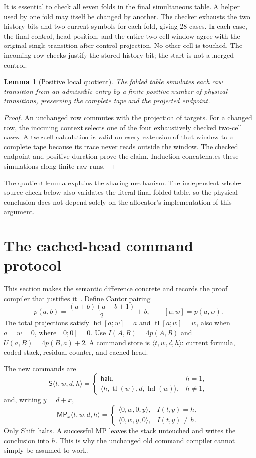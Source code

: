 \documentclass[11pt]{article}
\newtheorem{lemma}[theorem]{Lemma}
\newcommand{\MP}{\mathsf{MP}}
\newcommand{\Shift}{\mathsf{S}}
\begin{document}
It is essential to check all seven folds in the final simultaneous table.
A helper used by one fold may itself be changed by another. The checker
exhausts the two history bits and two current symbols for each fold,
giving 28 cases. In each case, the final control, head position, and the
entire two-cell window agree with the original single transition after
control projection. No other cell is touched. The incoming-row checks
justify the stored history bit; the start is not a merged control.

\begin{lemma}[Positive local quotient]
The folded table simulates each raw transition from an admissible entry
by a finite positive number of physical transitions, preserving the
complete tape and the projected endpoint.
\end{lemma}
\begin{proof}
An unchanged row commutes with the projection of targets. For a changed
row, the incoming context selects one of the four exhaustively checked
two-cell cases. A two-cell calculation is valid on every extension of
that window to a complete tape because its trace never reads outside
the window. The checked endpoint and positive duration prove the claim.
Induction concatenates these simulations along finite raw runs.
\end{proof}

The quotient lemma explains the sharing mechanism. The independent
whole-source check below also validates the literal final folded table,
so the physical conclusion does not depend solely on the allocator's
implementation of this argument.

\section{The cached-head command protocol}\label{sec:commands}

This section makes the semantic difference concrete and records the
proof compiler that justifies it~\cite{pa195c}. Define Cantor pairing
\[
p(a,b)=\frac{(a+b)(a+b+1)}2+b,\qquad [a;w]=p(a,w).
\]
The total projections satisfy $\operatorname{hd}[a;w]=a$ and
$\operatorname{tl}[a;w]=w$, also when $a=w=0$, where $[0;0]=0$.
Use $I(A,B)=4p(A,B)$ and $U(a,B)=4p(B,a)+2$.
A command store is $\langle t,w,d,h\rangle$: current formula, coded stack,
residual counter, and cached head.

The new commands are
\[
\Shift\langle t,w,d,h\rangle=
\begin{cases}
\mathsf{halt},&h=1,\\
\langle h,\operatorname{tl}(w),d,\operatorname{hd}(w)\rangle,&h\ne1,
\end{cases}
\]
and, writing $y=d+x$,
\[
\MP_x\langle t,w,d,h\rangle=
\begin{cases}
\langle0,w,0,y\rangle,&I(t,y)=h,\\
\langle0,w,y,0\rangle,&I(t,y)\ne h.
\end{cases}
\]
Only Shift halts. A successful MP leaves the stack untouched and writes
the conclusion into $h$. This is why the unchanged old command compiler
cannot simply be assumed to work.
\end{document}
